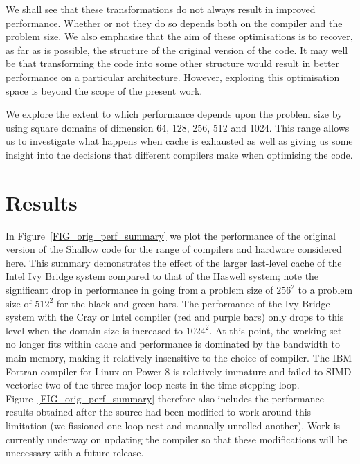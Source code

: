 \documentclass[journal]{IEEEtran}
\begin{document}
We shall see that these transformations do not always result in improved
performance. Whether or not they do so depends both on the compiler
and the problem size. We also emphasise that the aim of these
optimisations is to recover, as far as is possible, the structure of
the original version of the code. It may well be that transforming the
code into some other structure would result in better performance on a
particular architecture. However, exploring this optimisation space is
beyond the scope of the present work.

We explore the extent to which performance depends upon the problem
size by using square domains of dimension 64, 128, 256, 512 and
1024. This range allows us to investigate what happens when cache is
exhausted as well as giving us some insight into the decisions that
different compilers make when optimising the code.

\section{Results}

In Figure~\ref{FIG_orig_perf_summary} we plot the performance of the
original version of the Shallow code for the range of compilers and
hardware considered here. This summary demonstrates the effect of the
larger last-level cache of the Intel Ivy Bridge system compared to
that of the Haswell system; note the significant drop in performance
in going from a problem size of $256^{2}$ to a problem size of
$512^{2}$ for the black and green bars. The performance of the Ivy
Bridge system with the Cray or Intel compiler (red and purple bars)
only drops to this level when the domain size is increased to
$1024^{2}$. At this point, the working set no longer fits within cache
and performance is dominated by the bandwidth to main memory, making
it relatively insensitive to the choice of compiler. The IBM Fortran
compiler for Linux on Power 8 is relatively immature and failed to
SIMD-vectorise two of the three major loop nests in the time-stepping
loop. Figure~\ref{FIG_orig_perf_summary} therefore also includes the
performance results obtained after the source had been modified to
work-around this limitation (we fissioned one loop nest and manually
unrolled another). Work is currently underway on updating the compiler
so that these modifications will be unecessary with a future release.
\end{document}
